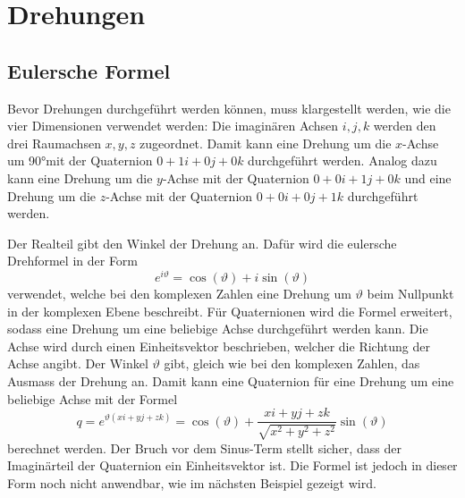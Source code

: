 %
%
%
%

\section{Drehungen\label{qa:section:drehungen}}
\subsection{Eulersche Formel}
Bevor Drehungen durchgeführt werden können, muss klargestellt werden, 
wie die vier Dimensionen verwendet werden: Die imaginären Achsen 
$i,j,k$ werden den drei Raumachsen $x,y,z$ zugeordnet. Damit kann eine 
Drehung um die $x$-Achse um 90°mit der Quaternion $0 + 1i + 0j + 0k$ 
durchgeführt werden. Analog dazu kann eine Drehung um die $y$-Achse 
mit der Quaternion $0 + 0i + 1\!j + 0k$ und eine Drehung um die 
$z$-Achse mit der Quaternion $0 + 0i + 0j + 1k$ durchgeführt werden.

Der Realteil gibt den Winkel der 
Drehung an. Dafür wird die eulersche Drehformel in der Form
\begin{equation*}
    e^{i\vartheta} = \cos(\vartheta) + i\sin(\vartheta)
\end{equation*}
verwendet, welche bei den komplexen Zahlen eine Drehung um $\vartheta$ 
beim Nullpunkt in der komplexen Ebene beschreibt. Für Quaternionen 
wird die Formel erweitert, sodass eine Drehung um eine beliebige 
Achse durchgeführt werden kann. Die Achse wird durch einen 
Einheitsvektor beschrieben, welcher die Richtung der Achse angibt. 
Der Winkel $\vartheta$ gibt, gleich wie bei den komplexen Zahlen, 
das Ausmass der Drehung an. Damit kann eine Quaternion für eine 
Drehung um eine beliebige Achse mit der Formel
\begin{equation*}
    q = e^{\vartheta(xi + yj + zk)} 
    = \cos \left(\vartheta\right) 
    + \frac{xi + yj + zk}{\sqrt{x^2 + y^2 + z^2}}\sin\left(\vartheta\right)
\end{equation*}
berechnet werden. Der Bruch vor dem Sinus-Term stellt sicher, dass 
der Imaginärteil der Quaternion ein Einheitsvektor ist. Die Formel 
ist jedoch in dieser Form noch nicht anwendbar, wie im nächsten 
Beispiel gezeigt wird.

